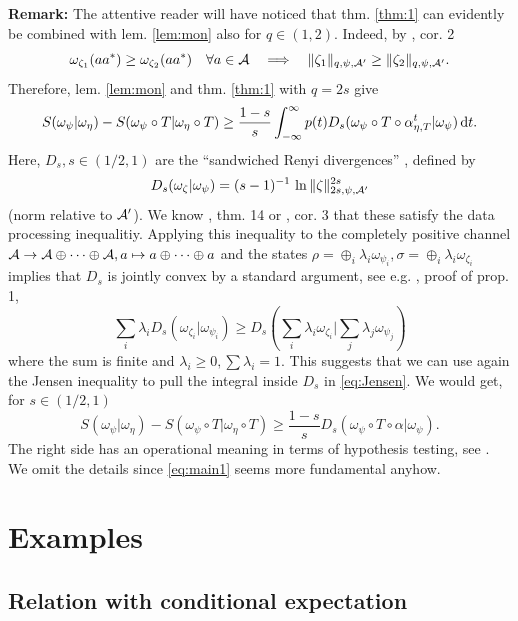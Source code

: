 \documentclass[english,a4paper,12pt]{article}
\def\cA{{\mathfrak A}}
\def\cB{{\mathfrak B}}
\newcommand{\ca}[1]{{\cal #1}}
\newcommand{\ben}{\begin{equation}}
\newcommand{\een}{\end{equation}}
\def\cA{{\ca A}}
\def\cB{{\ca B}}
\newcommand{\dd}{{\rm d}}
\renewcommand{\log}{\operatorname{ln}}
\begin{document}
\noindent
{\bf Remark:} The attentive reader will have noticed that thm. \ref{thm:1} can evidently 
be combined with lem. \ref{lem:mon} also for $q \in (1,2)$. 
Indeed, by \cite{Hollands2}, cor. 2
\ben
\omega_{\zeta_1}(aa^*) \ge \omega_{\zeta_2}(aa^*) \quad \forall a \in \cA \quad 
\Longrightarrow \quad \| \zeta_1 \|_{q,\psi,\cA'} \ge \| \zeta_2 \|_{q,\psi,\cA'}. 
\een
Therefore, lem. \ref{lem:mon} 
and thm. \ref{thm:1} with $q=2s$ give
\ben
\label{eq:Jensen}
S(\omega_\psi | \omega_\eta) - S(\omega_\psi \circ T | \omega_\eta \circ T)
\ge \frac{1-s}{s}  \int_{-\infty}^\infty p(t)  D_{s} ( \omega_\psi \circ T \circ \alpha_{\eta,T}^t | \omega_\psi)
\, \dd t .
\een
Here, $D_s, s \in (1/2,1)$ are the ``sandwiched Renyi divergences'' \cite{mueller}, defined by 
\ben
D_s(\omega_\zeta | \omega_\psi) = (s-1)^{-1} \, \log \| \zeta \|_{2s,\psi,\cA'}^{2s}
\een
 (norm relative to $\cA'$). 
We know  \cite{Berta2}, thm. 14 or \cite{Hollands2}, cor. 3 that these satisfy the 
data processing inequalitiy. Applying this inequality to the completely positive channel 
$ \cA \to \cA \oplus \cdots \oplus \cA, a \mapsto a \oplus \cdots \oplus a$ and the 
states $\rho = \oplus_i \lambda_i \omega_{\psi_i}, \sigma = \oplus_i \lambda_i \omega_{\zeta_i}$ implies that $D_s$ is 
jointly convex by a standard argument, see e.g. \cite{mueller}, proof of prop. 1, 
\ben
\sum_i \lambda_i D_s(\omega_{\zeta_i} | \omega_{\psi_i}) \ge D_s(\sum_i \lambda_i \omega_{\zeta_i} | \sum_j \lambda_j \omega_{\psi_j})
\een
where the sum is finite and $\lambda_i \ge 0, \sum \lambda_i=1$.
This suggests that we can use again the 
Jensen inequality to pull the integral inside $D_s$ in \eqref{eq:Jensen}. We would get, for $s \in (1/2,1)$
\ben
S(\omega_\psi | \omega_\eta) - S(\omega_\psi \circ T | \omega_\eta \circ T)
\ge \frac{1-s}{s} D_{s} (\omega_\psi \circ T \circ \alpha | \omega_\psi ). 
\een
The right side has an operational meaning in terms of hypothesis testing, see \cite{om}. We omit the details since \eqref{eq:main1} seems more fundamental anyhow.

\section{Examples}\label{sec:4}

\subsection{Relation with conditional expectation}
\end{document}
